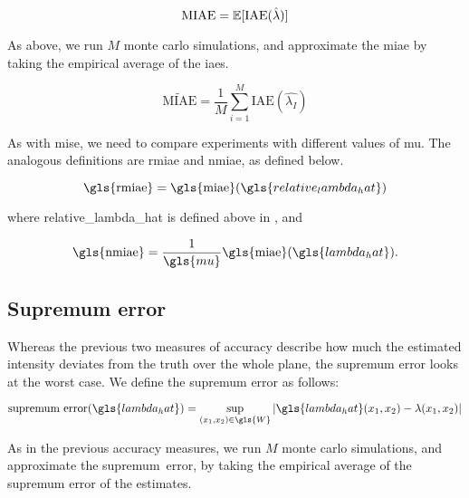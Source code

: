\begin{equation}
    \mbox{MIAE} = \mathbb{E} [\mbox{IAE}(\hat{\lambda})]
\end{equation}

As above, we run $M$ monte carlo simulations,
and approximate the \gls{miae} by taking the empirical average of the \glspl{iae}.

\begin{equation}
    \widetilde{\mbox{MIAE}} = \frac{1}{M} \sum_{i=1}^{M} \mbox{IAE}(\hat{\lambda_I})
\end{equation}

As with \gls{mise}, we need to compare experiments with different values of \gls{mu}.
The analogous definitions are \gls{rmiae} and \gls{nmiae}, as defined below.

\begin{equation}
\label{eq:rmiae}
    \mbox{\gls{rmiae}} = 
        \mbox{\gls{miae}}(\gls{relative_lambda_hat})
\end{equation}

where \gls{relative_lambda_hat} is defined above in ,
and

\begin{equation}
\label{eq:nmiae}
    \mbox{\gls{nmiae}} = 
        \frac{1}{\gls{mu}} \mbox{\gls{miae}}(\gls{lambda_hat}) \text{.}
\end{equation}


\subsection{Supremum error}
\label{subsec:method:sup_error}

Whereas the previous two measures of accuracy describe how much the estimated intensity deviates from the truth over the whole plane,
the \gls{supremum error} looks at the worst case.
We define the \gls{supremum error} as follows:

\begin{equation}
    \mbox{supremum error}(\gls{lambda_hat}) = \sup_{\xvec \in \gls{W}}
        {\left|
            \gls{lambda_hat}\xvec - \lambda\xvec
        \right|}
\end{equation}

As in the previous accuracy measures, we run $M$ monte carlo simulations, and approximate the \mbox{supremum error}, by taking the empirical average of the supremum error of the estimates.

